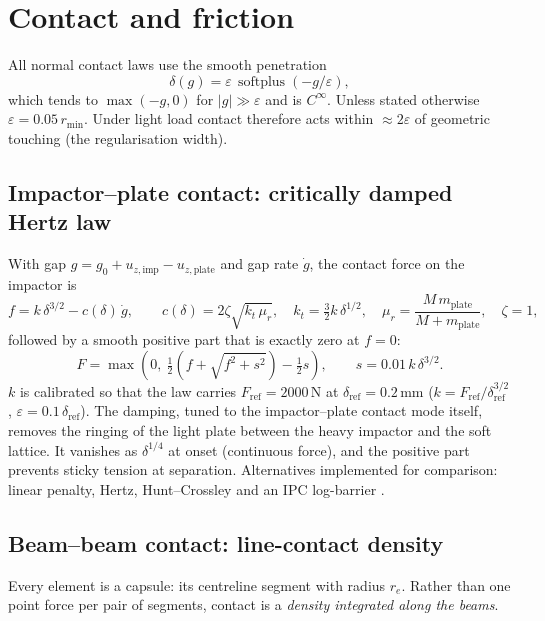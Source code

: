 \documentclass[11pt,a4paper]{article}
\newcommand{\softplus}{\operatorname{softplus}}
\begin{document}
\section{Contact and friction}
\label{sec:contact}
All normal contact laws use the smooth penetration
\begin{equation}
\delta(g) = \varepsilon\,\softplus(-g/\varepsilon) ,
\end{equation}
which tends to $\max(-g,0)$ for $|g|\gg\varepsilon$ and is $C^\infty$. Unless stated otherwise
$\varepsilon = 0.05\,r_{\min}$. Under light load contact therefore acts within $\approx2\varepsilon$ of
geometric touching (the regularisation width).

\subsection{Impactor--plate contact: critically damped Hertz law}
\label{sec:impactor-contact}
With gap $g = g_0 + u_{z,\mathrm{imp}} - u_{z,\mathrm{plate}}$ and gap rate $\dot g$, the contact force on the
impactor is
\begin{equation}
f = k\,\delta^{3/2} - c(\delta)\,\dot g,\qquad c(\delta) = 2\zeta\sqrt{k_t\,\mu_r},\quad k_t = \tfrac32 k\,\delta^{1/2},
\quad \mu_r = \frac{M\,m_\mathrm{plate}}{M+m_\mathrm{plate}},\quad \zeta = 1,
\end{equation}
followed by a smooth positive part that is exactly zero at $f=0$:
\begin{equation}
F = \max\!\left(0,\ \tfrac12\left(f + \sqrt{f^2 + s^2}\right) - \tfrac12 s\right),\qquad s = 0.01\,k\,\delta^{3/2}.
\end{equation}
$k$ is calibrated so that the law carries $F_\mathrm{ref} = 2000$\,N at $\delta_\mathrm{ref} = 0.2$\,mm
($k = F_\mathrm{ref}/\delta_\mathrm{ref}^{3/2}$, $\varepsilon = 0.1\,\delta_\mathrm{ref}$). The damping, tuned
to the impactor--plate contact mode itself, removes the ringing of the light plate between the heavy impactor
and the soft lattice. It vanishes as $\delta^{1/4}$ at onset (continuous force), and the positive part prevents
sticky tension at separation. Alternatives implemented for comparison: linear penalty, Hertz, Hunt--Crossley
\cite{hunt1975,lankarani1990} and an IPC log-barrier \cite{li2020ipc}.

\subsection{Beam--beam contact: line-contact density}
\label{sec:beam-beam}
Every element is a capsule: its centreline segment with radius $r_e$. Rather than one point force per pair of
segments, contact is a \emph{density integrated along the beams}.
\end{document}
